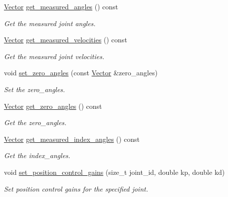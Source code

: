 \begin{DoxyCompactItemize}
\hyperlink{classblmc__robots_1_1BlmcJointModules_abaff382c6fd4b494ec0c17498d94919e}{Vector} \hyperlink{classblmc__robots_1_1BlmcJointModules_af739948e89e5192eb853c7c5dcb9e87f}{get\+\_\+measured\+\_\+angles} () const 
\begin{DoxyCompactList}\small\item\em Get the measured joint angles. \end{DoxyCompactList}\item 
\hyperlink{classblmc__robots_1_1BlmcJointModules_abaff382c6fd4b494ec0c17498d94919e}{Vector} \hyperlink{classblmc__robots_1_1BlmcJointModules_a87320890796f67050faa4fa506d5142d}{get\+\_\+measured\+\_\+velocities} () const 
\begin{DoxyCompactList}\small\item\em Get the measured joint velocities. \end{DoxyCompactList}\item 
void \hyperlink{classblmc__robots_1_1BlmcJointModules_abc94960666d33b6a5071d4cf25f7794d}{set\+\_\+zero\+\_\+angles} (const \hyperlink{classblmc__robots_1_1BlmcJointModules_abaff382c6fd4b494ec0c17498d94919e}{Vector} \&zero\+\_\+angles)
\begin{DoxyCompactList}\small\item\em Set the zero\+\_\+angles. \end{DoxyCompactList}\item 
\hyperlink{classblmc__robots_1_1BlmcJointModules_abaff382c6fd4b494ec0c17498d94919e}{Vector} \hyperlink{classblmc__robots_1_1BlmcJointModules_a4ca83d65d009aaafe4522d431490bb1d}{get\+\_\+zero\+\_\+angles} () const 
\begin{DoxyCompactList}\small\item\em Get the zero\+\_\+angles. \end{DoxyCompactList}\item 
\hyperlink{classblmc__robots_1_1BlmcJointModules_abaff382c6fd4b494ec0c17498d94919e}{Vector} \hyperlink{classblmc__robots_1_1BlmcJointModules_a0ef05c89eeb1ffde131f44d4f3a300c8}{get\+\_\+measured\+\_\+index\+\_\+angles} () const 
\begin{DoxyCompactList}\small\item\em Get the index\+\_\+angles. \end{DoxyCompactList}\item 
void \hyperlink{classblmc__robots_1_1BlmcJointModules_ada76994634fd0f15fb5df311a61e97d7}{set\+\_\+position\+\_\+control\+\_\+gains} (size\+\_\+t joint\+\_\+id, double kp, double kd)
\begin{DoxyCompactList}\small\item\em Set position control gains for the specified joint. \end{DoxyCompactList}\item 

\end{DoxyCompactItemize}
